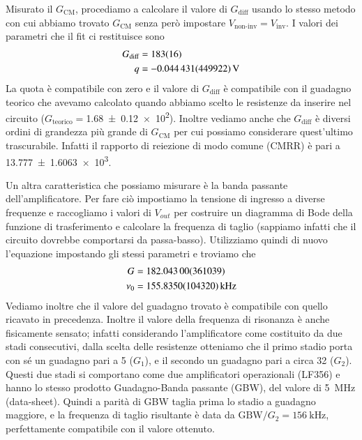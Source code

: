 \documentclass[
    rmp,
    reprint, 
    superscriptaddress, 
    altaffilletter, 
    amsmath, 
    amssymb,
    a4paper]{revtex4-2}
\begin{document}
Misurato il $G_{\text{CM}}$, procediamo a calcolare il valore di $G_{\text{diff}}$ usando lo stesso metodo con cui abbiamo trovato $G_{\text{CM}}$ senza però impostare $V_{\text{non-inv}}=V_{\text{inv}}$. I valori dei parametri che il fit ci restituisce sono
\begin{align*}
    G_{\text{diff}} &=\num[round-mode=none]{183+-16} \\
    q &=\SI{-0.044431+-0.449922}{\volt} \\
\end{align*}
La quota è compatibile con zero e il valore di $G_{\text{diff}}$ è compatibile con il guadagno teorico che avevamo calcolato quando abbiamo scelto le resistenze da inserire nel circuito ($G_{\text{teorico}}=$\num{1.68 +- 0.12e2}). Inoltre vediamo anche che $G_{\text{diff}}$ è diversi ordini di grandezza più grande di $G_{\text{CM}}$ per cui possiamo considerare quest'ultimo trascurabile. Infatti il rapporto di reiezione di modo comune (CMRR) è pari a \num{13.777+-1.6063e3}.

Un altra caratteristica che possiamo misurare è la banda passante dell'amplificatore. Per fare ciò impostiamo la tensione di ingresso a diverse frequenze e raccogliamo i valori di $V_{out}$ per costruire un diagramma di Bode della funzione di trasferimento e calcolare la frequenza di taglio (sappiamo infatti che il circuito dovrebbe comportarsi da passa-basso). Utilizziamo quindi di nuovo l'equazione  impostando gli stessi parametri e troviamo che 
\begin{align*}
    G     &=\num{ 182.043 +-  3.61039} \\
    \nu_0 &=\SI{ 155.835 +-  10.4320}{\kilo\hertz} \\ 
\end{align*}
Vediamo inoltre che il valore del guadagno trovato è compatibile con quello ricavato in precedenza. 
Inoltre il valore della frequenza di risonanza è anche fisicamente sensato; infatti considerando l'amplificatore come costituito da due stadi consecutivi, dalla scelta delle resistenze otteniamo che il primo stadio porta con sé un guadagno pari a 5 ($G_{1}$), e il secondo un guadagno pari a circa 32 ($G_{2}$). Questi due stadi si comportano come due amplificatori operazionali (LF356) e hanno lo stesso prodotto Guadagno-Banda passante (GBW), del valore di \SI{5}{\mega\hertz} (data-sheet). Quindi a parità di GBW taglia prima lo stadio a guadagno maggiore, e la frequenza di taglio risultante è data da $\text{GBW}/G_{2} = \SI{156}{\kilo\hertz}$, perfettamente compatibile con il valore ottenuto.
\end{document}
